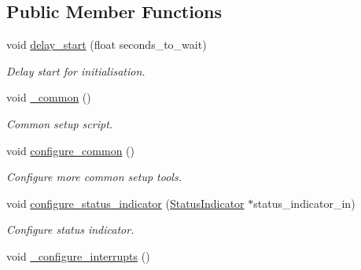 \subsection*{Public Member Functions}
\begin{DoxyCompactItemize}
\item 
void \hyperlink{classSPMB_1_1SetupManager_ac81e9e0b26c8560fe12ba38f3147bf8d}{delay\+\_\+start} (float seconds\+\_\+to\+\_\+wait)\hypertarget{classSPMB_1_1SetupManager_ac81e9e0b26c8560fe12ba38f3147bf8d}{}\label{classSPMB_1_1SetupManager_ac81e9e0b26c8560fe12ba38f3147bf8d}

\begin{DoxyCompactList}\small\item\em Delay start for initialisation. \end{DoxyCompactList}\item 
void \hyperlink{classSPMB_1_1SetupManager_a1c09eba4b47ad6012b6d3ced131da0a4}{\+\_\+common} ()\hypertarget{classSPMB_1_1SetupManager_a1c09eba4b47ad6012b6d3ced131da0a4}{}\label{classSPMB_1_1SetupManager_a1c09eba4b47ad6012b6d3ced131da0a4}

\begin{DoxyCompactList}\small\item\em Common setup script. \end{DoxyCompactList}\item 
void \hyperlink{classSPMB_1_1SetupManager_ae32219bb0aadfbfa2db519a6ebb58555}{configure\+\_\+common} ()\hypertarget{classSPMB_1_1SetupManager_ae32219bb0aadfbfa2db519a6ebb58555}{}\label{classSPMB_1_1SetupManager_ae32219bb0aadfbfa2db519a6ebb58555}

\begin{DoxyCompactList}\small\item\em Configure more common setup tools. \end{DoxyCompactList}\item 
void \hyperlink{classSPMB_1_1SetupManager_a4a1120a522bf828a08d603ce4982e58d}{configure\+\_\+status\+\_\+indicator} (\hyperlink{classSPMB_1_1StatusIndicator}{Status\+Indicator} $\ast$status\+\_\+indicator\+\_\+in)\hypertarget{classSPMB_1_1SetupManager_a4a1120a522bf828a08d603ce4982e58d}{}\label{classSPMB_1_1SetupManager_a4a1120a522bf828a08d603ce4982e58d}

\begin{DoxyCompactList}\small\item\em Configure status indicator. \end{DoxyCompactList}\item 
void \hyperlink{classSPMB_1_1SetupManager_ad22820d8804c92c80f06c267486f3cc8}{\+\_\+configure\+\_\+interrupts} ()\hypertarget{classSPMB_1_1SetupManager_ad22820d8804c92c80f06c267486f3cc8}{}\label{classSPMB_1_1SetupManager_ad22820d8804c92c80f06c267486f3cc8}


\end{DoxyCompactItemize}
